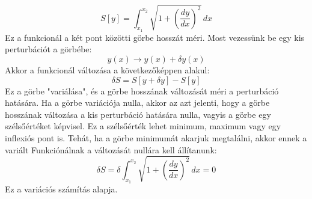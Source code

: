 \documentclass[../main.tex]{subfiles}
\begin{document}
\begin{equation}
    S[y] = \int_{x_1}^{x_2} \sqrt{1 + \left(\frac{dy}{dx}\right)^2} \, dx
\end{equation}
Ez a funkcionál a két pont közötti görbe hosszát méri. Most vezessünk be egy kis perturbációt a görbébe:
\begin{equation}
    y(x) \to y(x) + \delta y(x)
\end{equation}
Akkor a funkcionál változása a következőképpen alakul:
\begin{equation}
    \delta S = S[y + \delta y] - S[y]
\end{equation}
Ez a görbe "variálása", és a görbe hosszának változását méri a perturbáció hatására. Ha a görbe variációja nulla, akkor az azt jelenti, hogy a görbe hosszának változása a kis perturbáció hatására nulla,
vagyis a görbe egy szélsőértéket képvisel. Ez a szélsőérték lehet minimum, maximum vagy egy inflexiós pont is. Tehát, ha a görbe minimumát akarjuk megtalálni, akkor ennek a variált Funkciónálnak a változását nullára kell állítanunk:
\begin{equation}
    \delta S = \delta \int_{x_1}^{x_2} \sqrt{1 + \left(\frac{dy}{dx}\right)^2} \, dx = 0
\end{equation}
Ez a variációs számítás alapja.
\end{document}
